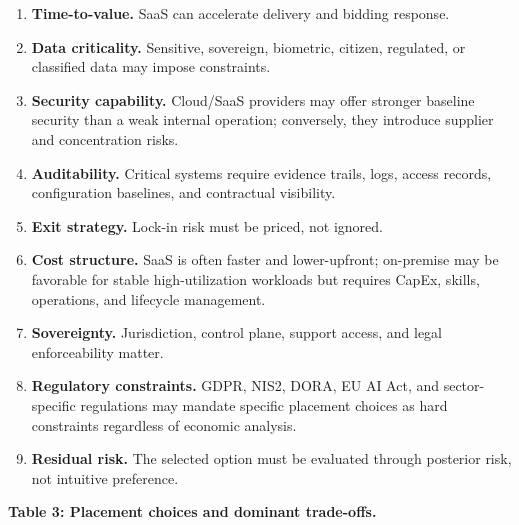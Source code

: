\documentclass[
]{article}
\providecommand{\tightlist}{%
  \setlength{\itemsep}{0pt}\setlength{\parskip}{0pt}}
\begin{document}
\begin{enumerate}
\def\labelenumi{\arabic{enumi}.}
\tightlist
\item
  \textbf{Time-to-value.} SaaS can accelerate delivery and bidding
  response.
\item
  \textbf{Data criticality.} Sensitive, sovereign, biometric, citizen,
  regulated, or classified data may impose constraints.
\item
  \textbf{Security capability.} Cloud/SaaS providers may offer stronger
  baseline security than a weak internal operation; conversely, they
  introduce supplier and concentration risks.
\item
  \textbf{Auditability.} Critical systems require evidence trails, logs,
  access records, configuration baselines, and contractual visibility.
\item
  \textbf{Exit strategy.} Lock-in risk must be priced, not ignored.
\item
  \textbf{Cost structure.} SaaS is often faster and lower-upfront;
  on-premise may be favorable for stable high-utilization workloads but
  requires CapEx, skills, operations, and lifecycle management.
\item
  \textbf{Sovereignty.} Jurisdiction, control plane, support access, and
  legal enforceability matter.
\item
  \textbf{Regulatory constraints.} GDPR, NIS2, DORA, EU AI Act, and
  sector-specific regulations may mandate specific placement choices as
  hard constraints regardless of economic analysis.
\item
  \textbf{Residual risk.} The selected option must be evaluated through
  posterior risk, not intuitive preference.
\end{enumerate}

\textbf{Table 3: Placement choices and dominant trade-offs.}
\end{document}
